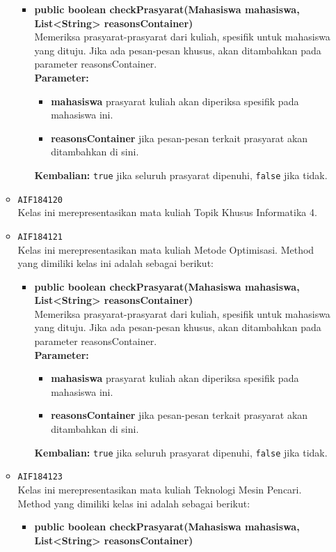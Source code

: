 \begin{enumerate}
\begin{itemize}
\begin{itemize}
\item \textbf{public boolean checkPrasyarat(Mahasiswa mahasiswa, List<String> reasonsContainer)}\\
Memeriksa prasyarat-prasyarat dari kuliah, spesifik untuk mahasiswa yang dituju. Jika ada pesan-pesan khusus, akan ditambahkan pada parameter reasonsContainer.\\
\textbf{Parameter:}
\begin{itemize}
\item \textbf{mahasiswa} prasyarat kuliah akan diperiksa spesifik pada mahasiswa ini.
\item \textbf{reasonsContainer} jika pesan-pesan terkait prasyarat akan ditambahkan di sini.
\end{itemize}
\textbf{Kembalian:} \texttt{true} jika seluruh prasyarat dipenuhi, \texttt{false} jika tidak.
\end{itemize}
\item \texttt{AIF184120} \\
Kelas ini merepresentasikan mata kuliah Topik Khusus Informatika 4.
\item \texttt{AIF184121} \\
Kelas ini merepresentasikan mata kuliah Metode Optimisasi. Method yang dimiliki kelas ini adalah sebagai berikut: 
\begin{itemize}
\item \textbf{public boolean checkPrasyarat(Mahasiswa mahasiswa, List<String> reasonsContainer)}\\
Memeriksa prasyarat-prasyarat dari kuliah, spesifik untuk mahasiswa yang dituju. Jika ada pesan-pesan khusus, akan ditambahkan pada parameter reasonsContainer.\\
\textbf{Parameter:}
\begin{itemize}
\item \textbf{mahasiswa} prasyarat kuliah akan diperiksa spesifik pada mahasiswa ini.
\item \textbf{reasonsContainer} jika pesan-pesan terkait prasyarat akan ditambahkan di sini.
\end{itemize}
\textbf{Kembalian:} \texttt{true} jika seluruh prasyarat dipenuhi, \texttt{false} jika tidak.
\end{itemize}
\item \texttt{AIF184123} \\
Kelas ini merepresentasikan mata kuliah Teknologi Mesin Pencari. Method yang dimiliki kelas ini adalah sebagai berikut: 
\begin{itemize}
\item \textbf{public boolean checkPrasyarat(Mahasiswa mahasiswa, List<String> reasonsContainer)}\\

\end{itemize}
\end{itemize}
\end{enumerate}
